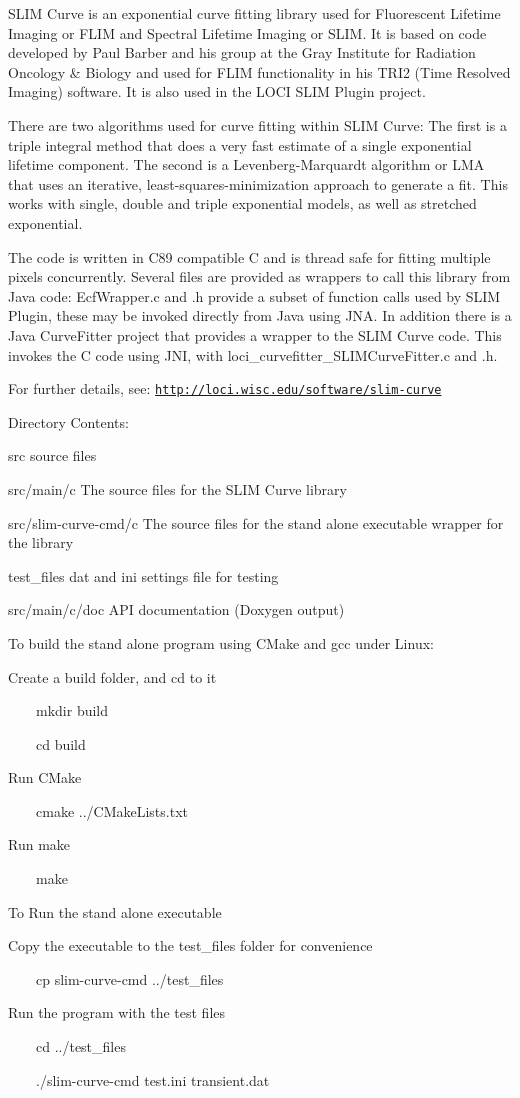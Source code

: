 S\-L\-I\-M Curve is an exponential curve fitting library used for Fluorescent Lifetime Imaging or F\-L\-I\-M and Spectral Lifetime Imaging or S\-L\-I\-M. It is based on code developed by Paul Barber and his group at the Gray Institute for Radiation Oncology \& Biology and used for F\-L\-I\-M functionality in his T\-R\-I2 (Time Resolved Imaging) software. It is also used in the L\-O\-C\-I S\-L\-I\-M Plugin project.

There are two algorithms used for curve fitting within S\-L\-I\-M Curve\-: The first is a triple integral method that does a very fast estimate of a single exponential lifetime component. The second is a Levenberg-\/\-Marquardt algorithm or L\-M\-A that uses an iterative, least-\/squares-\/minimization approach to generate a fit. This works with single, double and triple exponential models, as well as stretched exponential.

The code is written in C89 compatible C and is thread safe for fitting multiple pixels concurrently. Several files are provided as wrappers to call this library from Java code\-: Ecf\-Wrapper.\-c and .h provide a subset of function calls used by S\-L\-I\-M Plugin, these may be invoked directly from Java using J\-N\-A. In addition there is a Java Curve\-Fitter project that provides a wrapper to the S\-L\-I\-M Curve code. This invokes the C code using J\-N\-I, with loci\-\_\-curvefitter\-\_\-\-S\-L\-I\-M\-Curve\-Fitter.\-c and .h.

For further details, see\-: \href{http://loci.wisc.edu/software/slim-curve}{\tt http\-://loci.\-wisc.\-edu/software/slim-\/curve}

Directory Contents\-:\par
 src source files\par
 src/main/c The source files for the S\-L\-I\-M Curve library\par
 src/slim-\/curve-\/cmd/c The source files for the stand alone executable wrapper for the library\par
 test\-\_\-files dat and ini settings file for testing\par
 src/main/c/doc A\-P\-I documentation (Doxygen output)\par


To build the stand alone program using C\-Make and gcc under Linux\-:\par
 Create a build folder, and cd to it\par
 ~~~~mkdir build\par
 ~~~~cd build\par
 Run C\-Make\par
 ~~~~cmake ../\-C\-Make\-Lists.txt\par
 Run make\par
 ~~~~make\par


To Run the stand alone executable\par
 Copy the executable to the test\-\_\-files folder for convenience\par
 ~~~~cp slim-\/curve-\/cmd ../test\-\_\-files\par
 Run the program with the test files\par
 ~~~~cd ../test\-\_\-files\par
 ~~~~./slim-\/curve-\/cmd test.\-ini transient.\-dat\par
 